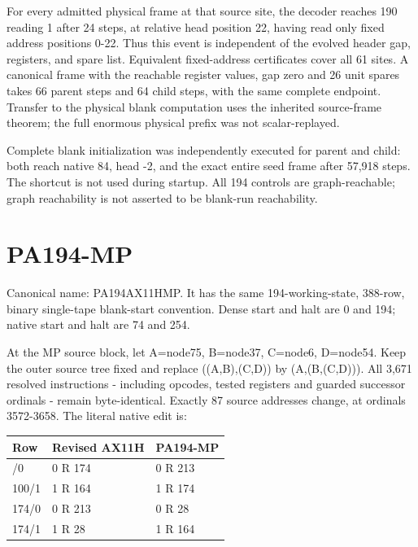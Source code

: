 \documentclass[10pt,a4paper]{article}
\begin{document}
For every admitted physical frame at that source site, the decoder reaches 190 reading 1 after 24 steps, at relative head position 22, having read only fixed address positions 0-22. Thus this event is independent of the evolved header gap, registers, and spare list. Equivalent fixed-address certificates cover all 61 sites. A canonical frame with the reachable register values, gap zero and 26 unit spares takes 66 parent steps and 64 child steps, with the same complete endpoint. Transfer to the physical blank computation uses the inherited source-frame theorem; the full enormous physical prefix was not scalar-replayed.

Complete blank initialization was independently executed for parent and child: both reach native 84, head -2, and the exact entire seed frame after 57,918 steps. The shortcut is not used during startup. All 194 controls are graph-reachable; graph reachability is not asserted to be blank-run reachability.

\section{PA194-MP}\label{pa194-mp}

Canonical name: PA194AX11HMP. It has the same 194-working-state, 388-row, binary single-tape blank-start convention. Dense start and halt are 0 and 194; native start and halt are 74 and 254.

At the MP source block, let A=node75, B=node37, C=node6, D=node54. Keep the outer source tree fixed and replace ((A,B),(C,D)) by (A,(B,(C,D))). All 3,671 resolved instructions - including opcodes, tested registers and guarded successor ordinals - remain byte-identical. Exactly 87 source addresses change, at ordinals 3572-3658. The literal native edit is:

\begin{longtable}[]{@{}lll@{}}
\toprule\noalign{}
Row & Revised AX11H & PA194-MP \\
\midrule\noalign{}
\endhead
\bottomrule\noalign{}
\endlastfoot
100/0 & 0 R 174 & 0 R 213 \\
100/1 & 1 R 164 & 1 R 174 \\
174/0 & 0 R 213 & 0 R 28 \\
174/1 & 1 R 28 & 1 R 164 \\
\end{longtable}
\end{document}
